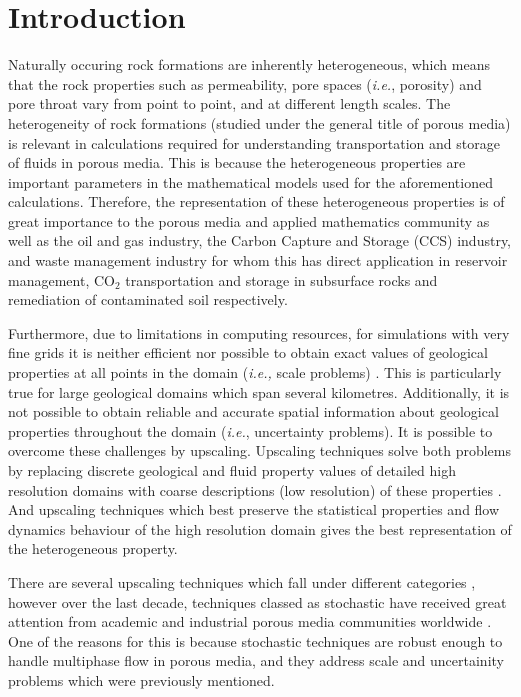 \documentclass[preprint,12pt]{elsarticle}
\newcommand{\ie}{{\it i.e., }}
\begin{document}
\section{Introduction}\label{section:intro}
Naturally occuring rock formations are inherently heterogeneous, which means that the rock properties such as permeability, pore spaces ({\it i.e.}, porosity) and pore throat vary from point to point, and at different length scales. The heterogeneity of rock formations (studied under the general title of porous media) is relevant in calculations required for understanding transportation and storage of fluids in porous media. This is because the heterogeneous properties are important parameters in the mathematical models used for the aforementioned calculations. Therefore, the representation of these heterogeneous properties is of great importance to the porous media and applied mathematics community as well as the oil and gas industry, the Carbon Capture and Storage (CCS) industry, and waste management industry for whom this has direct application in reservoir management, CO$_2$ transportation and storage in subsurface rocks and remediation of contaminated soil respectively.

Furthermore, due to limitations in computing resources, for simulations with very fine grids it is neither efficient nor possible to obtain exact values of geological properties at all points in the domain (\ie scale problems) \cite{Renard_1997} \cite{miller_1998} \cite{chen_2006}. This is particularly true for large geological domains which span several kilometres. Additionally, it is not possible to obtain reliable and accurate spatial information about geological properties throughout the domain ({\it i.e.}, uncertainty problems). It is possible to overcome these challenges by upscaling. Upscaling techniques solve both problems by replacing discrete geological and fluid property values of detailed high resolution domains with coarse descriptions (low resolution) of these properties \cite{Vereecken_2007}. And upscaling techniques which best preserve the statistical properties and flow dynamics behaviour of the high resolution domain gives the best representation of the heterogeneous property.

There are several upscaling techniques which fall under different categories \cite{Renard_1997, Szymkiewicz_2013, Hasting_2001}, however over the last decade, techniques classed as stochastic have received great attention from academic and industrial porous media communities worldwide \cite{Verwoerd_2009, Ravalec-Dupin_2010, Guilleminot_2012}. One of the reasons for this is because stochastic techniques are robust enough to handle multiphase flow in porous media, and they address scale and uncertainity problems which were previously mentioned.
\end{document}
